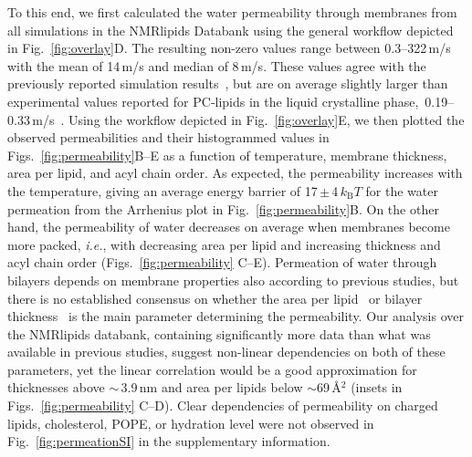 \documentclass[fleqn,10pt]{wlscirep}
\begin{document}
To this end, we first calculated the water permeability through membranes from all simulations in the NMRlipids Databank using the general workflow depicted in Fig.~\ref{fig:overlay}D. The resulting non-zero values range between 0.3--322\,\textmu{}m/s with the mean of 14\,\textmu{}m/s and median of 8\,\textmu{}m/s. These values agree with the previously reported simulation results~\cite{venable19,camilo2022}, but are on average slightly larger than experimental values reported for PC-lipids in the liquid crystalline phase,~0.19--0.33\,\textmu{}m/s~\cite{jansen95}. Using the workflow depicted in Fig.~\ref{fig:overlay}E, we then plotted the observed permeabilities and their histogrammed values in Figs.~\ref{fig:permeability}B--E as a function of temperature, membrane thickness, area per lipid, and acyl chain order. As expected, the permeability increases with the temperature, giving an average energy barrier of 17\,$\pm$\,4\,$k_\mathrm{B}T$ for the water permeation from the Arrhenius plot in Fig.~\ref{fig:permeability}B. On the other hand, the permeability of water decreases on average when membranes become more packed, \textit{i.e.}, with decreasing area per lipid and increasing thickness and acyl chain order (Figs.~\ref{fig:permeability} C--E). Permeation of water through bilayers depends on membrane properties also according to previous studies, but there is no established consensus on whether the area per lipid~\cite{nagle08} or bilayer thickness~\cite{frallicciardi22} is the main parameter determining the permeability. 
Our analysis over the NMRlipids databank, containing significantly more data than what was available in previous studies, suggest non-linear dependencies on both of these parameters, yet the linear correlation would be a good approximation for thicknesses above $\sim$\,3.9\,nm and area per lipids below $\sim$69\,\AA{}$^2$ (insets in Figs.~\ref{fig:permeability} C--D).
Clear dependencies of permeability on charged lipids, cholesterol, POPE, or hydration level were not observed in Fig.~\ref{fig:permeationSI} in the supplementary information.
%
\end{document}
